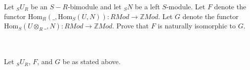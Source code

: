 Let $_SU_R$ be an $S-R$-bimodule and let $_SN$ be a left $S$-module. Let $F$ denote the functor
$\text{Hom}_R(\_,\text{Hom}_S(U,N)):RMod\to \mathbb{Z}Mod$. Let $G$ denote the functor
$\text{Hom}_S(U\otimes_R\_,N):RMod\to \mathbb{Z}Mod$. Prove that $F$ is naturally isomorphic to $G$.\\\\

\begin{solution}\renewcommand{\qedsymbol}{}\ \\
    Let $_SU_R$, $F$, and $G$ be as stated above.
\end{solution}